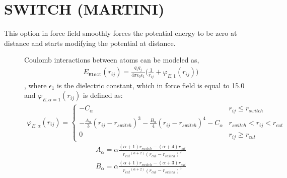 \documentclass[letterpaper,10pt,english]{sphinxmanual}
\begin{document}
\section{SWITCH (MARTINI)}
\label{\detokenize{electrostatic:switch-martini}}
This option in  force field smoothly forces the potential energy to be zero at  distance and starts modifying the potential at  distance.
\begin{description}
\item[{}] \leavevmode
Coulomb interactions between atoms can be modeled as,
\begin{equation*}
\begin{split}E_{\texttt{Elect}}(r_{ij})=\frac{q_i q_j}{4\pi\epsilon_0\epsilon_1}\bigg(\frac{1}{r_{ij}}+\varphi_{E, 1}(r_{ij})\bigg)\end{split}
\end{equation*}
, where \(\epsilon_1\) is the dielectric constant, which in  force field is equal to 15.0 and \(\varphi_{E, \alpha = 1}(r_{ij})\) is defined as:
\begin{equation*}
\begin{split}\varphi_{E, \alpha}(r_{ij}) =
\begin{cases}
  -C_{\alpha} & r_{ij} \leq r_{switch} \\
  -\frac{A_{\alpha}}{3} (r_{ij} - r_{switch})^3 -\frac{B_{\alpha}}{4} (r_{ij} - r_{switch})^4 - C_{\alpha} & r_{switch} < r_{ij} < r_{cut} \\
  0 & r_{ij} \geq r_{cut}
\end{cases}\end{split}
\end{equation*}\begin{equation*}
\begin{split}A_{\alpha} = \alpha \frac{(\alpha + 1) r_{switch} - (\alpha +4) r_{cut}} {{r_{cut}}^{(\alpha + 2)} {(r_{cut} - r_{switch})}^2}\end{split}
\end{equation*}\begin{equation*}
\begin{split}B_{\alpha} = \alpha \frac{(\alpha + 1) r_{switch} - (\alpha +3) r_{cut}} {{r_{cut}}^{(\alpha + 2)} {(r_{cut} - r_{switch})}^3}\end{split}
\end{equation*}\begin{equation*}

\end{equation*}
\end{description}
\end{document}
